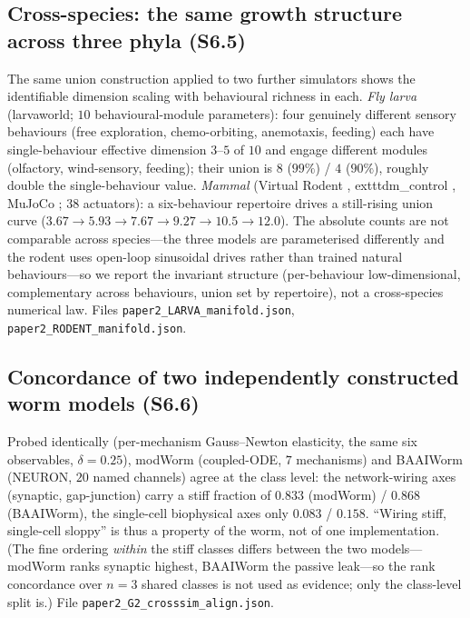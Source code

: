 \documentclass[11pt]{article}
\begin{document}
\subsection{Cross-species: the same growth structure across three phyla (S6.5)}
The same union construction applied to two further simulators shows the identifiable dimension scaling with behavioural richness in each. \emph{Fly larva} (larvaworld; $10$ behavioural-module parameters): four genuinely different sensory behaviours (free exploration, chemo-orbiting, anemotaxis, feeding) each have single-behaviour effective dimension $3$--$5$ of $10$ and engage different modules (olfactory, wind-sensory, feeding); their union is $8$ ($99\%$) / $4$ ($90\%$), roughly double the single-behaviour value. \emph{Mammal} (Virtual Rodent \citep{merel2019deep,aldarondo2024virtual}, 	exttt{dm\_control} \citep{tunyasuvunakool2020dmcontrol}, MuJoCo \citep{todorov2012mujoco}; $38$ actuators): a six-behaviour repertoire drives a still-rising union curve ($3.67\to5.93\to7.67\to9.27\to10.5\to12.0$). The absolute counts are not comparable across species---the three models are parameterised differently and the rodent uses open-loop sinusoidal drives rather than trained natural behaviours---so we report the invariant structure (per-behaviour low-dimensional, complementary across behaviours, union set by repertoire), not a cross-species numerical law. Files \texttt{paper2\_LARVA\_manifold.json}, \texttt{paper2\_RODENT\_manifold.json}.

\subsection{Concordance of two independently constructed worm models (S6.6)}
Probed identically (per-mechanism Gauss--Newton elasticity, the same six observables, $\delta{=}0.25$), modWorm (coupled-ODE, $7$ mechanisms) and BAAIWorm (NEURON, $20$ named channels) agree at the class level: the network-wiring axes (synaptic, gap-junction) carry a stiff fraction of $0.833$ (modWorm) / $0.868$ (BAAIWorm), the single-cell biophysical axes only $0.083$ / $0.158$. ``Wiring stiff, single-cell sloppy'' is thus a property of the worm, not of one implementation. (The fine ordering \emph{within} the stiff classes differs between the two models---modWorm ranks synaptic highest, BAAIWorm the passive leak---so the rank concordance over $n{=}3$ shared classes is not used as evidence; only the class-level split is.) File \texttt{paper2\_G2\_crosssim\_align.json}.
\end{document}
